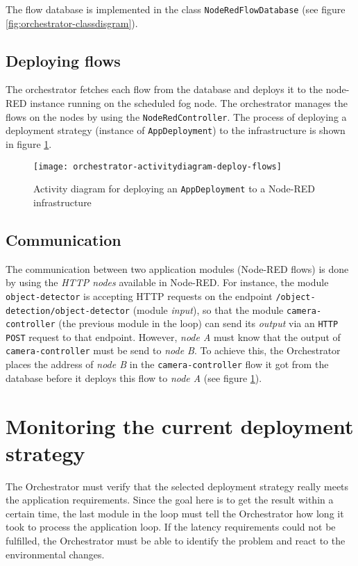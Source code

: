 The flow database is implemented in the class \texttt{NodeRedFlowDatabase} (see figure \ref{fig:orchestrator-classdisgram}).

\subsection*{Deploying flows}
The orchestrator fetches each flow from the database and deploys it to the node-RED instance running on the scheduled fog node. The orchestrator manages the flows on the nodes by using the \texttt{NodeRedController}. The process of deploying a deployment strategy (instance of \texttt{AppDeployment}) to the infrastructure is shown in figure \ref{fig:orchestrator-activitydiagram-deploy-flows}.

\begin{figure}[htb]
    \centering
    \texttt{[image: orchestrator-activitydiagram-deploy-flows]}
    \caption{Activity diagram for deploying an \texttt{AppDeployment} to a Node-RED infrastructure}
    \label{fig:orchestrator-activitydiagram-deploy-flows}
\end{figure}

\subsection*{Communication}
The communication between two application modules (Node-RED flows) is done by using the \textit{HTTP nodes} available in Node-RED. For instance, the module \texttt{object-detector} is accepting HTTP requests on the endpoint \texttt{/object-detection/object-detector} (module \textit{input}), so that the module \texttt{camera-controller} (the previous module in the loop) can send its \textit{output} via an \texttt{HTTP POST} request to that endpoint. However, \textit{node A} must know that the output of \texttt{camera-controller} must be send to \textit{node B}. To achieve this, the Orchestrator places the address of \textit{node B} in the \texttt{camera-controller} flow it got from the database before it deploys this flow to \textit{node A} (see figure \ref{fig:orchestrator-activitydiagram-deploy-flows}).

\section{Monitoring the current deployment strategy}

The Orchestrator must verify that the selected deployment strategy really meets the application requirements. Since the goal here is to get the result within a certain time, the last module in the loop must tell the Orchestrator how long it took to process the application loop. If the latency requirements could not be fulfilled, the Orchestrator must be able to identify the problem and react to the environmental changes.

